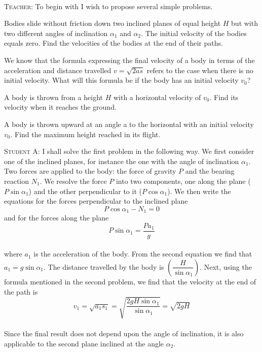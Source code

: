 \documentclass[a4paper,sfsidenotes]{tufte-book}
\begin{document}
\paragraph{}
\textsc{Teacher:} To begin with I wish to propose several simple problems. 
\begin{description}[leftmargin=1cm, style=nextline]
\item[The first problem:] Bodies slide without friction down two inclined planes of equal height $H$
but with two different angles of inclination $\alpha_{1}$ and $\alpha_{2}$. The initial velocity of the bodies equals zero. Find the velocities of the bodies at the end of their paths.

\item[The second problem:] We know that the formula expressing the final velocity of a body in terms of the acceleration and distance travelled $v = \sqrt{2as}$ refers to the case when there is no initial velocity. What will this formula be if the body has an initial velocity $v_{0}$? 

\item[The third problem:] A body is thrown from a height $H$ with a horizontal velocity of $v_{0}$. Find its velocity when it reaches the ground. 

\item[The fourth problem:] A body is thrown upward at an angle a to the horizontal with an initial velocity $v_{0}$. Find the maximum height reached in its flight.
\end{description}

\textsc{Student A:} I shall solve the first problem in the following way. We first consider one of the inclined planes, for instance the one with the angle of inclination $\alpha_{1}$. Two forces are applied to the body: the force of gravity $P$ and the bearing reaction $N_{1}$. We resolve the force $P$ into two components, one along the plane ($P \sin \alpha_{1}$) and the other perpendicular to it
($P \cos \alpha_{1}$). We then write the equations for the forces perpendicular to the inclined plane
\begin{equation*}
P \cos \alpha_{1} - N_{1} = 0
\end{equation*}
and for the forces along the plane 
\begin{equation*}
P \sin \alpha_{1}  = \frac{P a_{1}}{g}
\end{equation*}
\\
where $a_{1}$ is the acceleration of the body. From the second equation we find that $a_{1} =g \sin \alpha_{1}$. The distance travelled by the body is $\left(\dfrac{H}{\sin \alpha_{1}}\right)$. Next, using the formula mentioned in the second problem, we find that the velocity at the end of
the path is
\begin{equation*}
v_{1}  = \sqrt{a_{1}s_{1}} = \sqrt{\frac{2gH \sin \alpha_{1}}{\sin \alpha_{1}}} = \sqrt{2gH}
\end{equation*}
\\
Since the final result does not depend upon the angle of inclination, it is also applicable to the second plane inclined at the angle $\alpha_{2}$.
\end{document}
